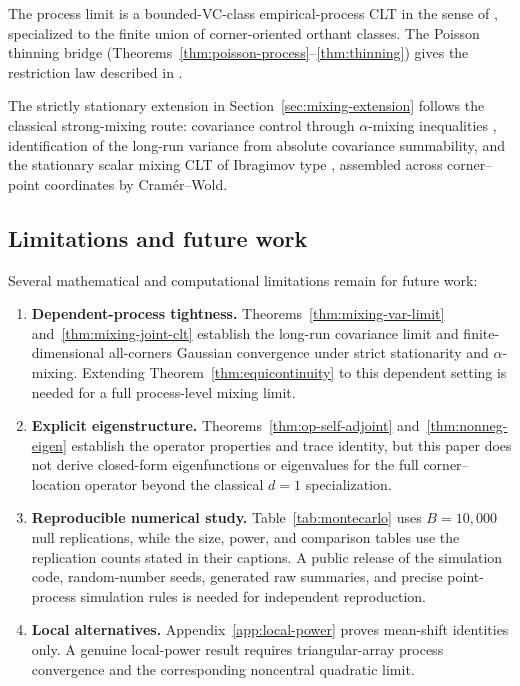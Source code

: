 \documentclass[pdflatex]{sn-jnl}
\theoremstyle{thmstyleone}
\theoremstyle{thmstyletwo}
\theoremstyle{thmstylethree}
\begin{document}
The process limit is a bounded-VC-class empirical-process CLT in the sense of \cite{vanderVaartWellner1996,GineNickl2016}, specialized to the finite union of corner-oriented orthant classes. The Poisson thinning bridge (Theorems~\ref{thm:poisson-process}--\ref{thm:thinning}) gives the restriction law described in \cite[Example~16.2]{vanLieshout2010}.

The strictly stationary extension in Section~\ref{sec:mixing-extension} follows the classical strong-mixing route: covariance control through $\alpha$-mixing inequalities \cite{Doukhan1994,Bradley2005,Rio2017}, identification of the long-run variance from absolute covariance summability, and the stationary scalar mixing CLT of Ibragimov type \cite{Ibragimov1962,Doukhan1994,Rio2017}, assembled across corner--point coordinates by Cram\'er--Wold.

\subsection{Limitations and future work}

Several mathematical and computational limitations remain for future work:

\begin{enumerate}
\item \textbf{Dependent-process tightness.} Theorems~\ref{thm:mixing-var-limit} and~\ref{thm:mixing-joint-clt} establish the long-run covariance limit and finite-dimensional all-corners Gaussian convergence under strict stationarity and $\alpha$-mixing. Extending Theorem~\ref{thm:equicontinuity} to this dependent setting is needed for a full process-level mixing limit.
\item \textbf{Explicit eigenstructure.} Theorems~\ref{thm:op-self-adjoint} and~\ref{thm:nonneg-eigen} establish the operator properties and trace identity, but this paper does not derive closed-form eigenfunctions or eigenvalues for the full corner--location operator beyond the classical $d=1$ specialization.
\item \textbf{Reproducible numerical study.} Table~\ref{tab:montecarlo} uses $B=10{,}000$ null replications, while the size, power, and comparison tables use the replication counts stated in their captions. A public release of the simulation code, random-number seeds, generated raw summaries, and precise point-process simulation rules is needed for independent reproduction.
\item \textbf{Local alternatives.} Appendix~\ref{app:local-power} proves mean-shift identities only. A genuine local-power result requires triangular-array process convergence and the corresponding noncentral quadratic limit.
\end{enumerate}
\end{document}
